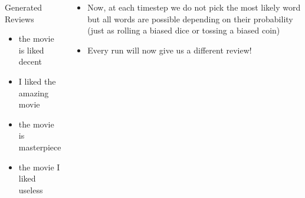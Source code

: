 \begin{frame}
	\begin{overlayarea}{\textwidth}{0.35\textheight}
	\begin{center}
	\end{center}
	\end{overlayarea}
	\begin{overlayarea}{\textwidth}{0.65\textheight}
		\begin{columns}
			\begin{overlayarea}{\textwidth}{\textheight}
				\visible<3->
				{
					\small{
						\begin{block}{Generated Reviews}
							\begin{itemize}
								\item<3-> the movie is liked decent
								\item<4-> I liked the amazing movie
								\item<5-> the movie is masterpiece
								\item<6-> the movie I liked useless
							\end{itemize}
						\end{block}
					}
				}
			\end{overlayarea}
			\begin{overlayarea}{\textwidth}{\textheight}
				\begin{itemize}\justifying
					\item<1-> Now, at each timestep we do not pick the most likely word but all words are possible depending on their probability (just as rolling a biased dice or tossing a biased coin)
					\item<2-> Every run will now give us a different review!
				\end{itemize}
			\end{overlayarea}
		\end{columns}
	\end{overlayarea}
\end{frame}



